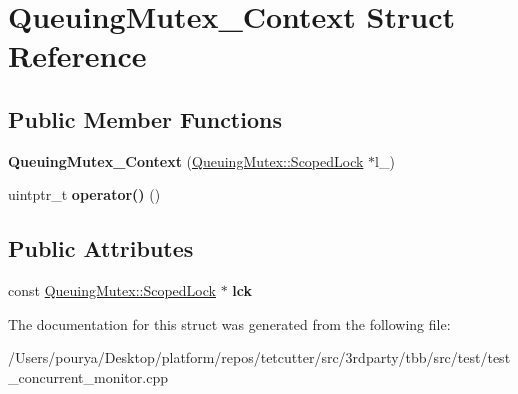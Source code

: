 \hypertarget{structQueuingMutex__Context}{}\section{Queuing\+Mutex\+\_\+\+Context Struct Reference}
\label{structQueuingMutex__Context}
\subsection*{Public Member Functions}
\begin{DoxyCompactItemize}
\item 
\hypertarget{structQueuingMutex__Context_affe693592ea91c5c494c3f053af0c1cf}{}{\bfseries Queuing\+Mutex\+\_\+\+Context} (\hyperlink{classQueuingMutex_1_1ScopedLock}{Queuing\+Mutex\+::\+Scoped\+Lock} $\ast$l\+\_\+)\label{structQueuingMutex__Context_affe693592ea91c5c494c3f053af0c1cf}

\item 
\hypertarget{structQueuingMutex__Context_ac177d8fbd875e2a76f03aa48cc468be7}{}uintptr\+\_\+t {\bfseries operator()} ()\label{structQueuingMutex__Context_ac177d8fbd875e2a76f03aa48cc468be7}

\end{DoxyCompactItemize}
\subsection*{Public Attributes}
\begin{DoxyCompactItemize}
\item 
\hypertarget{structQueuingMutex__Context_aa6c59c259ee260076f02100b7b926c4e}{}const \hyperlink{classQueuingMutex_1_1ScopedLock}{Queuing\+Mutex\+::\+Scoped\+Lock} $\ast$ {\bfseries lck}\label{structQueuingMutex__Context_aa6c59c259ee260076f02100b7b926c4e}

\end{DoxyCompactItemize}


The documentation for this struct was generated from the following file\+:\begin{DoxyCompactItemize}
\item 
/\+Users/pourya/\+Desktop/platform/repos/tetcutter/src/3rdparty/tbb/src/test/test\+\_\+concurrent\+\_\+monitor.\+cpp\end{DoxyCompactItemize}
